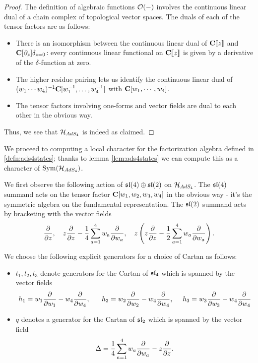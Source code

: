 \documentclass[../main.tex]{subfiles}
\begin{document}
\begin{proof}
The definition of algebraic functions $\mathcal O(-)$ involves the continuous linear dual of a chain complex of topological vector spaces. 
The duals of each of the tensor factors are as follows:

\begin{itemize}
\item There is an isomorphism between the continuous linear dual of $\mathbf{C}[\![ z]\!]$ and $\mathbf{C}[\partial_z]\delta_{z=0}$: every continuous linear functional on $\mathbf{C}[\![ z]\!]$ is given by a derivative of the $\delta$-function at zero. 
\item The higher residue pairing lets us identify the continuous linear dual of $(w_1\cdots w_4)^{-1} \mathbf{C}[w_1^{-1},\ldots, w_4^{-1}]$ with $\mathbf{C}[w_1,\cdots, w_4]$.
\item The tensor factors involving one-forms and vector fields are dual to each other in the obvious way.
\end{itemize}

Thus, we see that $\mathcal{H}_{AdS_4}$ is indeed as claimed.
\end{proof}

\parsec{}
We proceed to computing a local character for the factorization algebra defined in \ref{defn:ads4states}; thanks to lemma \ref{lem:ads4states} we can compute this as a character of $\text{Sym}(\mathcal{H}_{AdS_4})$. 

We first observe the following action of $\mathfrak{sl}(4)\oplus \mathfrak{sl}(2)$ on $\mathcal{H}_{AdS_4}$. The $\mathfrak{sl}(4)$ summand acts on the tensor factor $\mathbf{C}[w_1,w_2,w_3,w_4]$ in the obvious way - it's the symmetric algebra on the fundamental representation. The $\mathfrak{sl}(2)$ summand acts by bracketing with the vector fields 
\[
\frac{\partial}{\partial z} ,\quad z \frac{\partial}{\partial z} - \frac14 \sum_{a=1}^4 w_a \frac{\partial}{\partial w_a} , \quad z \left(z \frac{\partial}{\partial z} - \frac12 \sum_{a=1}^4 w_a \frac{\partial}{\partial w_a} \right).
\]

We choose the following explicit generators for a choice of Cartan as follows:
\begin{itemize}
\item $t_1, t_2, t_3$ denote generators for the Cartan of $\mathfrak{sl}_4$ which is spanned by the vector fields \[h_1 = w_1\frac{\partial}{\partial w_1}- w_4\frac{\partial}{\partial w_4}, \ \ \ \ \ h_2 = w_2\frac{\partial}{\partial w_2}- w_4\frac{\partial}{\partial w_4}, \ \ \ \ h_3 = w_3\frac{\partial}{\partial w_3}- w_4\frac{\partial}{\partial w_4}\]
\item $q$ denotes a generator for the Cartan of $\mathfrak{sl}_2$ which is spanned by the vector field \[\Delta = \frac14\sum_{a=1}^4 w_a \frac{\partial }{\partial w_a}-z\frac{\partial}{\partial z}.\]
\end{itemize}
\end{document}
